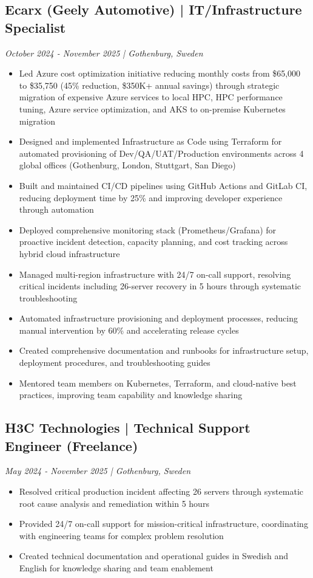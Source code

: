 \documentclass[11pt,a4paper]{article}
\begin{document}
\subsection*{Ecarx (Geely Automotive) | IT/Infrastructure Specialist}
\textit{October 2024 - November 2025 | Gothenburg, Sweden}

\begin{itemize}[leftmargin=*, itemsep=2pt]
\item Led Azure cost optimization initiative reducing monthly costs from \$65,000 to \$35,750 (45\% reduction, \$350K+ annual savings) through strategic migration of expensive Azure services to local HPC, HPC performance tuning, Azure service optimization, and AKS to on-premise Kubernetes migration
\item Designed and implemented Infrastructure as Code using Terraform for automated provisioning of Dev/QA/UAT/Production environments across 4 global offices (Gothenburg, London, Stuttgart, San Diego)
\item Built and maintained CI/CD pipelines using GitHub Actions and GitLab CI, reducing deployment time by 25\% and improving developer experience through automation
\item Deployed comprehensive monitoring stack (Prometheus/Grafana) for proactive incident detection, capacity planning, and cost tracking across hybrid cloud infrastructure
\item Managed multi-region infrastructure with 24/7 on-call support, resolving critical incidents including 26-server recovery in 5 hours through systematic troubleshooting
\item Automated infrastructure provisioning and deployment processes, reducing manual intervention by 60\% and accelerating release cycles
\item Created comprehensive documentation and runbooks for infrastructure setup, deployment procedures, and troubleshooting guides
\item Mentored team members on Kubernetes, Terraform, and cloud-native best practices, improving team capability and knowledge sharing
\end{itemize}

\subsection*{H3C Technologies | Technical Support Engineer (Freelance)}
\textit{May 2024 - November 2025 | Gothenburg, Sweden}

\begin{itemize}[leftmargin=*, itemsep=2pt]
\item Resolved critical production incident affecting 26 servers through systematic root cause analysis and remediation within 5 hours
\item Provided 24/7 on-call support for mission-critical infrastructure, coordinating with engineering teams for complex problem resolution
\item Created technical documentation and operational guides in Swedish and English for knowledge sharing and team enablement
\end{itemize}
\end{document}
